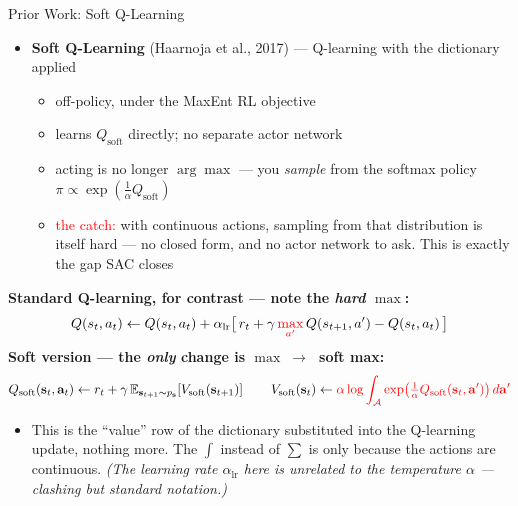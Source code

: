 \begin{frame}{Prior Work: Soft Q-Learning}
\small
\begin{itemize}
    \item \textbf{Soft Q-Learning} (Haarnoja et al., 2017)  --- Q-learning with the dictionary applied
    \begin{itemize}
        \item off-policy, under the MaxEnt RL objective
        \item learns $Q_{\text{soft}}$ directly; no separate actor network
        \item acting is no longer $\arg\max$ --- you \emph{sample} from the softmax policy $\pi \propto \exp(\tfrac1\alpha Q_{\text{soft}})$
        \item \textcolor{red}{the catch:} with continuous actions, sampling from that distribution is itself hard --- no closed form, and no actor network to ask. This is exactly the gap SAC closes
    \end{itemize}
\end{itemize}
\vspace{0.2em}
\textbf{\footnotesize Standard Q-learning, for contrast --- note the \emph{hard} $\max$:}
\[
Q(s_t, a_t) \leftarrow Q(s_t, a_t) + \alpha_{\text{lr}}\big[\, r_t + \gamma\, \textcolor{red}{\max_{a'}}\, Q(s_{t+1}, a') - Q(s_t, a_t) \,\big]
\]
\textbf{\footnotesize Soft version --- the \emph{only} change is $\max \;\to\;$ soft max:}
\[
Q_{\text{soft}}(\mathbf{s}_t, \mathbf{a}_t) \leftarrow r_t + \gamma\, \mathbb{E}_{\mathbf{s}_{t+1} \sim p_{\mathbf{s}}}\!\left[ V_{\text{soft}}(\mathbf{s}_{t+1}) \right]
\qquad
V_{\text{soft}}(\mathbf{s}_t) \leftarrow \textcolor{red}{\alpha \log \int_{\mathcal{A}} \exp\!\left( \tfrac{1}{\alpha} Q_{\text{soft}}(\mathbf{s}_t, \mathbf{a}') \right) d\mathbf{a}'}
\]
\vspace{-0.5em}
\begin{itemize}
    \item[] {\footnotesize This is the ``value'' row of the dictionary substituted into the Q-learning update, nothing more. The $\int$ instead of $\sum$ is only because the actions are continuous. \emph{(The learning rate $\alpha_{\text{lr}}$ here is unrelated to the temperature $\alpha$ --- clashing but standard notation.)}}
\end{itemize}
\end{frame}
